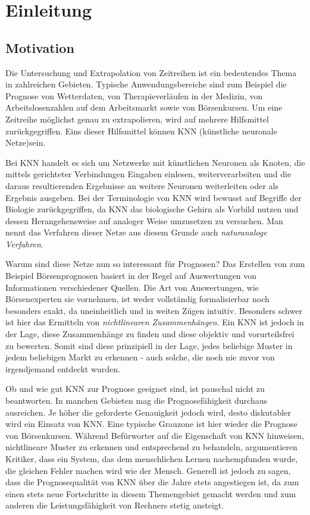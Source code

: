 \chapter{Einleitung}
\label{chapter:Einleitung}

\section{Motivation}
\label{section:Motivation}

Die Untersuchung und Extrapolation von Zeitreihen ist ein bedeutendes Thema in zahlreichen Gebieten. Typische Anwendungsbereiche sind zum Beispiel die Prognose von Wetterdaten, von Therapieverläufen in der  Medizin, von Arbeitslosenzahlen auf dem Arbeitsmarkt sowie von Börsenkursen. Um eine Zeitreihe möglichst genau zu extrapolieren, wird auf mehrere Hilfsmittel zurückgegriffen. Eins dieser Hilfsmittel können KNN (künstliche neuronale Netze)sein. 

Bei KNN handelt es sich um Netzwerke mit künstlichen Neuronen als Knoten, die mittels gerichteter Verbindungen Eingaben einlesen, weiterverarbeiten und die daraus resultierenden Ergebnisse an weitere Neuronen weiterleiten oder als Ergebnis ausgeben. Bei der Terminologie von KNN wird bewusst auf Begriffe der Biologie zurückgegriffen, da KNN das biologische Gehirn als Vorbild nutzen und dessen Herangehensweise auf analoger Weise umzusetzen zu versuchen. Man nennt das Verfahren dieser Netze aus diesem Grunde auch \textit{naturanaloge Verfahren}.

Warum sind diese Netze nun so interessant für Prognosen? Das Erstellen von zum Beispiel Börsenprognosen basiert in der Regel auf Auswertungen von Informationen verschiedener Quellen. Die Art von Auswertungen, wie Börsenexperten sie vornehmen, ist weder vollständig formalisierbar noch besonders exakt, da uneinheitlich und in weiten Zügen intuitiv. Besonders schwer ist hier das Ermitteln von \textit{nichtlinearen Zusammenhängen}. Ein KNN ist jedoch in der Lage, diese Zusammenhänge zu finden  und diese objektiv und vorurteilsfrei zu bewerten. Somit sind diese prinzipiell in der Lage, jedes beliebige Muster in jedem beliebigen Markt zu erkennen - auch solche, die noch nie zuvor von irgendjemand entdeckt wurden.

Ob und wie gut KNN zur Prognose geeignet sind, ist pauschal nicht zu beantworten. In manchen Gebieten mag die Prognosefähigkeit durchaus ausreichen. Je höher die geforderte Genauigkeit jedoch wird, desto diskutabler wird ein Einsatz von KNN. Eine typische Grauzone ist hier wieder die Prognose von Börsenkursen. Während Befürworter auf die Eigenschaft von KNN hinweisen, nichtlineare Muster zu erkennen und entsprechend zu behandeln, argumentieren Kritiker, dass ein System, das dem menschlichen Lernen nachempfunden wurde, die gleichen Fehler machen wird wie der Mensch. Generell ist jedoch zu sagen, dass die Prognosequalität von KNN über die Jahre stets angestiegen ist, da zum einen stets neue Fortschritte in diesem Themengebiet gemacht werden und zum anderen die Leistungsfähigkeit von Rechners stetig ansteigt. 

